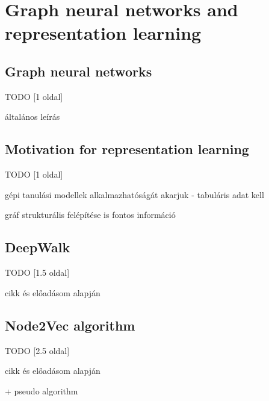 \chapter{Graph neural networks and representation learning}
\label{sec:RepresentationLearning}

\section{Graph neural networks}
TODO [1 oldal]

általános leírás

\section{Motivation for representation learning}
TODO [1 oldal]

gépi tanulási modellek alkalmazhatóságát akarjuk - tabuláris adat kell

gráf strukturális felépítése is fontos információ

\section{DeepWalk} 
TODO [1.5 oldal]

cikk és előadásom alapján

\section{Node2Vec algorithm}
TODO [2.5 oldal]

cikk és előadásom alapján

+ pseudo algorithm